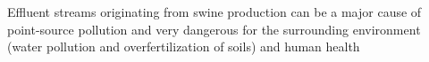 Effluent streams originating from swine production can be a major cause of point-source pollution and very dangerous for the surrounding environment (water pollution and overfertilization of soils) and human health